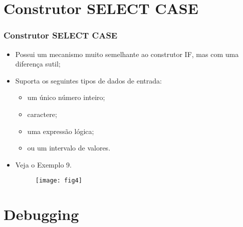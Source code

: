 \documentclass[xcolor=table]{beamer}
\newenvironment{stepitemize}{\begin{itemize}[<+->]}{\end{itemize} }
\begin{document}
\section{Construtor SELECT CASE}

\begin{frame}%

\frametitle{Construtor SELECT CASE}

\begin{stepitemize}
\item Possui um mecanismo muito semelhante ao construtor IF, mas com uma diferen\c{c}a sutil;

\item Suporta os seguintes tipos de dados de entrada:

\begin{itemize}
\item um \'{u}nico n\'{u}mero inteiro;

\item caractere;

\item uma express\~{a}o l\'{o}gica;

\item ou um intervalo de valores.
\end{itemize}

\item Veja o Exemplo 9.
\begin{figure}
	\texttt{[image: fig4]}
\end{figure}
\end{stepitemize}

\transboxout%
\end{frame}%

\section{Debugging}
\end{document}
